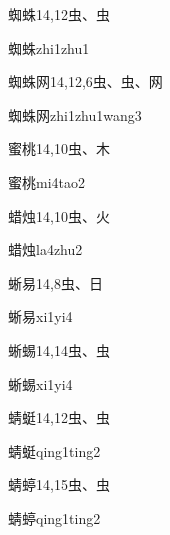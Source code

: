 \begin{entry}{蜘蛛}{14,12}{⾍、⾍}
  \begin{phonetics}{蜘蛛}{zhi1zhu1}
  \end{phonetics}
\end{entry}

\begin{entry}{蜘蛛网}{14,12,6}{⾍、⾍、⽹}
  \begin{phonetics}{蜘蛛网}{zhi1zhu1wang3}
  \end{phonetics}
\end{entry}

\begin{entry}{蜜桃}{14,10}{⾍、⽊}
  \begin{phonetics}{蜜桃}{mi4tao2}
  \end{phonetics}
\end{entry}

\begin{entry}{蜡烛}{14,10}{⾍、⽕}
  \begin{phonetics}{蜡烛}{la4zhu2}
  \end{phonetics}
\end{entry}

\begin{entry}{蜥易}{14,8}{⾍、⽇}
  \begin{phonetics}{蜥易}{xi1yi4}
  \end{phonetics}
\end{entry}

\begin{entry}{蜥蜴}{14,14}{⾍、⾍}
  \begin{phonetics}{蜥蜴}{xi1yi4}
  \end{phonetics}
\end{entry}

\begin{entry}{蜻蜓}{14,12}{⾍、⾍}
  \begin{phonetics}{蜻蜓}{qing1ting2}
  \end{phonetics}
\end{entry}

\begin{entry}{蜻蝏}{14,15}{⾍、⾍}
  \begin{phonetics}{蜻蝏}{qing1ting2}
  \end{phonetics}
\end{entry}

